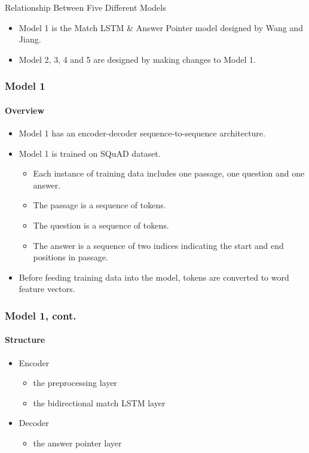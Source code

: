 \documentclass{beamer}
\begin{document}
\begin{frame}{Relationship Between Five Different Models}
    \begin{itemize}
        \item Model 1 is the Match LSTM \& Answer Pointer model designed by Wang and Jiang.
        \item Model 2, 3, 4 and 5 are designed by making changes to Model 1.
    \end{itemize}
\end{frame}

\begin{frame} \frametitle{Model 1}\framesubtitle{Overview}
  \begin{itemize}
      \item Model 1 has an encoder-decoder sequence-to-sequence architecture.
      \item Model 1 is trained on SQuAD dataset.
            \begin{itemize}
                \item Each instance of training data includes one passage, one question and one answer.
                \item The passage is a sequence of tokens.
                \item The question is a sequence of tokens.
                \item The answer is a sequence of two indices indicating the start and end positions in passage.
            \end{itemize}
      \item Before feeding training data into the model, tokens are converted to word feature vectors.
  \end{itemize}
\end{frame}

\begin{frame} \frametitle{Model 1, cont.}\framesubtitle{Structure}
    \begin{itemize}
        \item Encoder
            \begin{itemize}
                \item the preprocessing layer
                \item the bidirectional match LSTM layer
            \end{itemize}
        \item Decoder
            \begin{itemize}
                \item the answer pointer layer
            \end{itemize}
    \end{itemize}

\end{frame}
\end{document}
